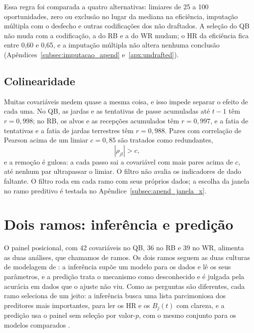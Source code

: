 Essa regra foi comparada a quatro alternativas: limiares de 25 a 100 oportunidades, zero ou exclusão no lugar da mediana na eficiência, imputação múltipla com o desfecho e outras codificações dos não draftados. A seleção do QB não muda com a codificação, a do RB e a do WR mudam; o HR da eficiência fica entre 0,60 e 0,65, e a imputação múltipla não altera nenhuma conclusão (Apêndices~\ref{subsec:imputacao_apend} e~\ref{apx:undrafted}).

\subsection{Colinearidade}
\label{subsec:triagem_colinearidade}

Muitas covariáveis medem quase a mesma coisa, e isso impede separar o efeito de cada uma. No QB, as jardas e as tentativas de passe acumuladas até $t-1$ têm $r=0{,}998$; no RB, os alvos e as recepções acumulados têm $r=0{,}997$, e a fatia de tentativas e a fatia de jardas terrestres têm $r=0{,}988$. Pares com correlação de Pearson acima de um limiar $c = 0{,}85$ são tratados como redundantes,
\begin{equation}
    |\rho_{jl}| > c,
    \label{eq:colinearidade}
\end{equation}
e a remoção é gulosa: a cada passo sai a covariável com mais pares acima de $c$, até nenhum par ultrapassar o limiar. O filtro não avalia os indicadores de dado faltante. O filtro roda em cada ramo com seus próprios dados; a escolha da janela no ramo preditivo é testada no Apêndice~\ref{subsec:apend_janela_x}.

\section{Dois ramos: inferência e predição}
\label{sec:dois_empregos}

O painel posicional, com 42 covariáveis no QB, 36 no RB e 39 no WR, alimenta as duas análises, que chamamos de ramos. Os dois ramos seguem as duas culturas de modelagem de \citet{breiman2001cultures}: a inferência supõe um modelo para os dados e lê os seus parâmetros, e a predição trata o mecanismo como desconhecido e é julgada pela acurácia em dados que o ajuste não viu. Como as perguntas são diferentes, cada ramo seleciona de um jeito: a inferência busca uma lista parcimoniosa dos preditores mais importantes, para ler os HR e os $B_j(t)$ com clareza, e a predição usa o painel sem seleção por valor-$p$, com o mesmo conjunto para os modelos comparados \citep{harrell2001}.

